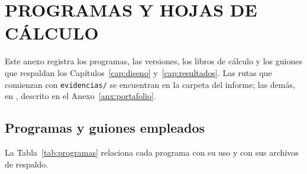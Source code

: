 \chapter{PROGRAMAS Y HOJAS DE CÁLCULO}
\label{anx:programas}

Este anexo registra los programas, las versiones, los libros de cálculo y los guiones que respaldan los Capítulos~\ref{cap:diseno} y~\ref{cap:resultados}. Las rutas que comienzan con \texttt{evidencias/} se encuentran en la carpeta del informe; las demás, en \RepoProyecto, descrito en el Anexo~\ref{anx:portafolio}.

\section{Programas y guiones empleados}
\label{sec:programas-empleados}

La Tabla~\ref{tab:programas} relaciona cada programa con su uso y con sus archivos de respaldo.

